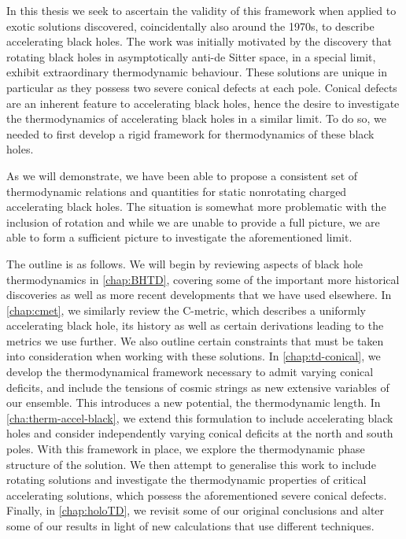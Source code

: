 \documentclass[
twoside,
openright,
frontopenright,
]{dmathesis}
\begin{document}
In this thesis we seek to ascertain the validity of this framework when applied
to exotic solutions discovered, coincidentally also around the 1970s, to
describe accelerating black holes. The work was initially motivated by the
discovery that rotating black holes in asymptotically anti-de Sitter space, in a
special limit, exhibit extraordinary thermodynamic behaviour. These solutions
are unique in particular as they possess two severe conical defects at each
pole. Conical defects are an inherent feature to accelerating black holes, hence
the desire to investigate the thermodynamics of accelerating black holes in a
similar limit. To do so, we needed to first develop a rigid framework for
thermodynamics of these black holes.

As we will demonstrate, we have been able to propose a consistent set of
thermodynamic relations and quantities for static nonrotating charged accelerating
black holes. The situation is somewhat more problematic with the inclusion of
rotation and while we are unable to provide a full picture, we are able to form
a sufficient picture to investigate the aforementioned limit.

The outline is as follows. We will begin by reviewing aspects of black hole
thermodynamics in \cref{chap:BHTD}, covering some of the important more
historical discoveries as well as more recent developments that we have used
elsewhere. In \cref{chap:cmet}, we similarly review the C-metric, which
describes a uniformly accelerating black hole, its history as well as certain
derivations leading to the metrics we use further. We also outline certain
constraints that must be taken into consideration when working with these
solutions. In \cref{chap:td-conical}, we develop the thermodynamical framework
necessary to admit varying conical deficits, and include the tensions of cosmic
strings as new extensive variables of our ensemble. This introduces a new
potential, the thermodynamic length. In \cref{cha:therm-accel-black}, we extend
this formulation to include accelerating black holes and consider independently
varying conical deficits at the north and south poles. With this framework in
place, we explore the thermodynamic phase structure of the solution. We then
attempt to generalise this work to include rotating solutions and investigate
the thermodynamic properties of critical accelerating solutions, which possess
the aforementioned severe conical defects. Finally, in \cref{chap:holoTD}, we
revisit some of our original conclusions and alter some of our results in light
of new calculations that use different techniques.
\end{document}

